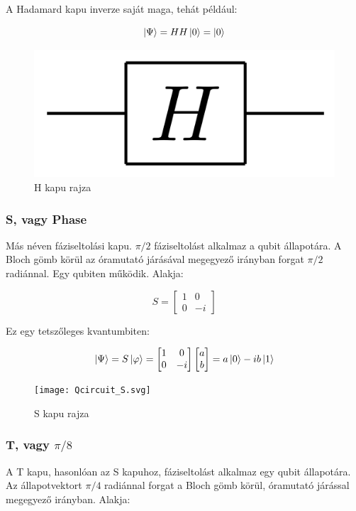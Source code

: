 \documentclass[
]{thesis-ekf}
\theoremstyle{definition}
\theoremstyle{remark}
\begin{document}
A Hadamard kapu inverze saját maga, tehát például:

\begin{equation}
	\ket{\Psi}=HH\ket{0}=\ket{0}
\end{equation}

\begin{figure}[H]
	\centering
	\includegraphics[width=0.3\linewidth]{Hadamard}
	\caption{H kapu rajza}
	\label{fig:hadamard}
\end{figure}


\subsubsection{S, vagy Phase}
Más néven fáziseltolási kapu. $\pi/2$ fáziseltolást alkalmaz a qubit állapotára. A Bloch gömb körül az óramutató járásával megegyező irányban forgat $\pi/2$ radiánnal. Egy qubiten működik. Alakja:

\begin{equation}
	S= 
	\begin{bmatrix}
		1 & 0\\
		0 & -i
	\end{bmatrix}
\end{equation}

Ez egy tetszőleges kvantumbiten:

\begin{equation}
	\ket{\Psi}=S\ket{\varphi}=
	\begin{bmatrix}
		1 & 0\\
		0 & -i
	\end{bmatrix}
	\begin{bmatrix}
		a\\
		b
	\end{bmatrix}=a\ket{0}-ib\ket{1}
\end{equation}

\begin{figure}[H]
	\centering
	\texttt{[image: Qcircuit\_S.svg]}
	\caption{S kapu rajza}
	\label{fig:qcircuits}
\end{figure}


\subsubsection{T, vagy $\pi/8$}
A T kapu, hasonlóan az S kapuhoz, fáziseltolást alkalmaz egy qubit állapotára. Az állapotvektort $\pi/4$ radiánnal forgat a Bloch gömb körül, óramutató járással megegyező irányban. Alakja:
\end{document}
